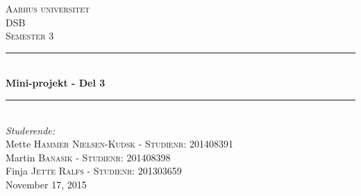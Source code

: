 \documentclass[12pt, letterpaper]{article}
\begin{document}
\begin{titlepage}

\newcommand{\HRule}{\rule{\linewidth}{0.5mm}} %

\center %
 

\textsc{\LARGE Aarhus universitet}\\[1.5cm] %
\textsc{\Large DSB}\\[0.5cm] %
\textsc{\large Semester 3}\\[0.5cm] %


\HRule \\[0.4cm]
{ \huge \bfseries Mini-projekt - Del 3}\\[0.4cm] %
\HRule \\[1.5cm]
 

\Large \emph{Studerende:}\\[1cm]
Mette \textsc{Hammer Nielsen-Kudsk - Studienr: 201408391}\\[0,5cm] %
Martin \textsc{Banasik - Studienr: 201408398}\\[0,5cm] %
Finja \textsc{Jette Ralfs - Studienr: 201303659}\\[0,5cm] %

{\large November 17, 2015}\\[1,2cm] %


\end{titlepage}
\end{document}
